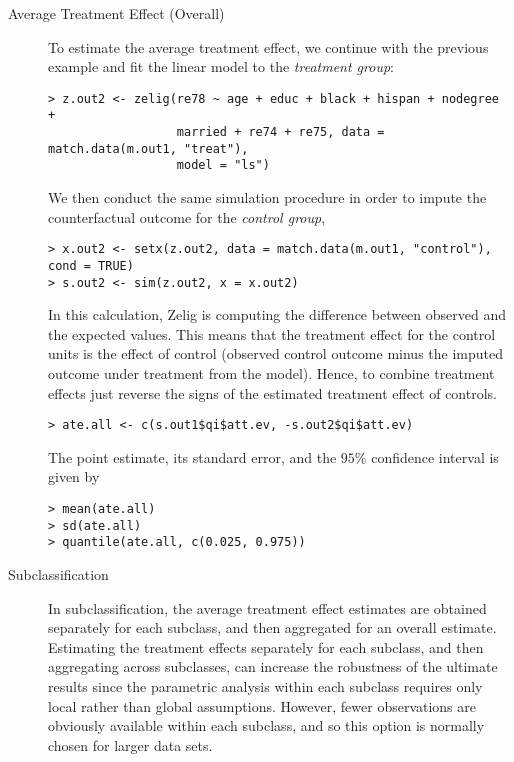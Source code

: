 \begin{description}
\item[Average Treatment Effect (Overall)] To estimate the average
  treatment effect, we continue with the previous example and fit the
  linear model to the {\it treatment group}:
\begin{verbatim}
> z.out2 <- zelig(re78 ~ age + educ + black + hispan + nodegree + 
                  married + re74 + re75, data = match.data(m.out1, "treat"), 
                  model = "ls")
\end{verbatim}
We then conduct the same simulation procedure in order to impute the
counterfactual outcome for the {\it control group},
\begin{verbatim}
> x.out2 <- setx(z.out2, data = match.data(m.out1, "control"), cond = TRUE)
> s.out2 <- sim(z.out2, x = x.out2)
\end{verbatim}
In this calculation, Zelig is computing the difference between
observed and the expected values.  This means that the treatment
effect for the control units is the effect of control (observed
control outcome minus the imputed outcome under treatment from the
model).  Hence, to combine treatment effects just reverse the signs of
the estimated treatment effect of controls.
\begin{verbatim}
> ate.all <- c(s.out1$qi$att.ev, -s.out2$qi$att.ev)
\end{verbatim}
The point estimate, its standard error, and the $95\%$ confidence
interval is given by
\begin{verbatim}
> mean(ate.all)
> sd(ate.all)
> quantile(ate.all, c(0.025, 0.975))
\end{verbatim}
  
\item[Subclassification] In subclassification, the average treatment
  effect estimates are obtained separately for each subclass, and then
  aggregated for an overall estimate.  Estimating the treatment
  effects separately for each subclass, and then aggregating across
  subclasses, can increase the robustness of the ultimate results
  since the parametric analysis within each subclass requires only
  local rather than global assumptions.  However, fewer observations
  are obviously available within each subclass, and so this option is
  normally chosen for larger data sets.


\end{description}
